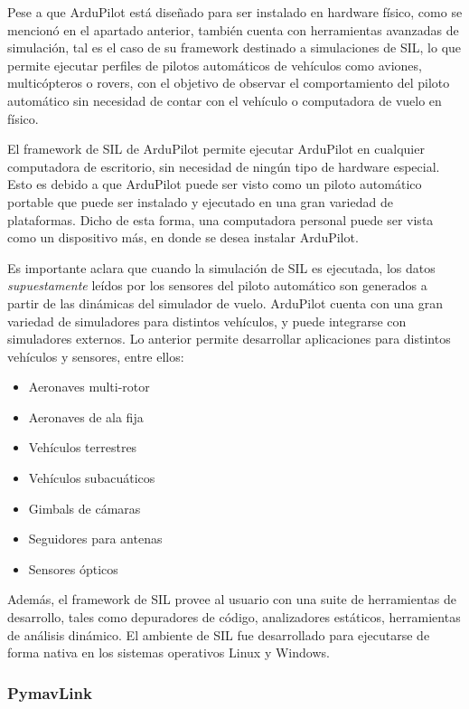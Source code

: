  Pese a que ArduPilot está diseñado para ser instalado en hardware físico, como se mencionó en el apartado anterior, también cuenta con herramientas avanzadas de simulación, tal es el caso de su framework destinado a simulaciones de SIL, lo que permite ejecutar perfiles de pilotos automáticos de vehículos como aviones, multicópteros o rovers, con el objetivo de observar el comportamiento del piloto automático sin necesidad de contar con el vehículo o computadora de vuelo en físico.

El framework de SIL de ArduPilot permite ejecutar ArduPilot en cualquier computadora de escritorio, sin necesidad de ningún tipo de hardware especial. Esto es debido a que ArduPilot puede ser visto como un piloto automático portable que puede ser instalado y ejecutado en una gran variedad de plataformas. Dicho de esta forma, una computadora personal puede ser vista como un dispositivo más, en donde se desea instalar ArduPilot.

Es importante aclara que cuando la simulación de SIL es ejecutada, los datos \textit{supuestamente} leídos por los sensores del piloto automático son generados a partir de las dinámicas del simulador de vuelo. ArduPilot cuenta con una gran variedad de simuladores para distintos vehículos, y puede integrarse con simuladores externos. Lo anterior permite desarrollar aplicaciones para distintos vehículos y sensores, entre ellos: 

\begin{itemize}
    \item Aeronaves multi-rotor
    \item Aeronaves de ala fija
    \item Vehículos terrestres
    \item Vehículos subacuáticos
    \item Gimbals de cámaras
    \item Seguidores para antenas
    \item Sensores ópticos
\end{itemize}

Además, el framework de SIL provee al usuario con una suite de herramientas de desarrollo, tales como depuradores de código, analizadores estáticos, herramientas de análisis dinámico. El ambiente de SIL fue desarrollado para ejecutarse de forma nativa en los sistemas operativos Linux y Windows.

\subsubsection{PymavLink}

